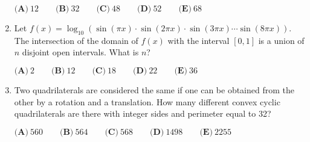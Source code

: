 \documentclass{article}
\begin{document}
\begin{enumerate}[label=\arabic*., itemsep=0.5em]
\(\textbf{(A)}\ 12 \qquad \textbf{(B)}\ 32 \qquad \textbf{(C)}\ 48 \qquad \textbf{(D)}\ 52 \qquad \textbf{(E)}\ 68\)\par \vspace{0.5em}\item Let \(f(x) = \log_{10} \left(\sin(\pi x) \cdot \sin(2 \pi x) \cdot \sin (3 \pi x) \cdots \sin(8 \pi x)\right)\). The intersection of the domain of \(f(x)\) with the interval \([0,1]\) is a union of \(n\) disjoint open intervals. What is \(n\)?

\(\textbf{(A)}\ 2 \qquad \textbf{(B)}\ 12 \qquad \textbf{(C)}\ 18 \qquad \textbf{(D)}\ 22 \qquad \textbf{(E)}\ 36\)\par \vspace{0.5em}\item Two quadrilaterals are considered the same if one can be obtained from the other by a rotation and a translation. How many different convex cyclic quadrilaterals are there with integer sides and perimeter equal to 32?

\(\textbf{(A)}\ 560 \qquad \textbf{(B)}\ 564 \qquad \textbf{(C)}\ 568 \qquad \textbf{(D)}\ 1498 \qquad \textbf{(E)}\ 2255\)\par \vspace{0.5em}\end{enumerate}
\end{document}

